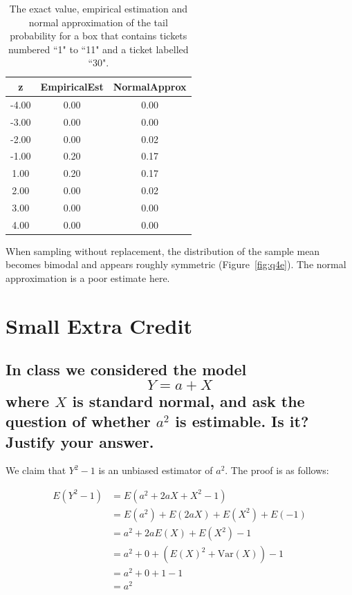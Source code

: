 \documentclass[11pt]{article}
\begin{document}
\begin{table}[H]
\centering
\begin{tabular}{|c|cc|}
  \hline
z & EmpiricalEst & NormalApprox \\ 
  \hline
-4.00 & 0.00 & 0.00 \\ 
  -3.00 & 0.00 & 0.00 \\ 
  -2.00 & 0.00 & 0.02 \\ 
  -1.00 & 0.20 & 0.17 \\ 
  1.00 & 0.20 & 0.17 \\ 
  2.00 & 0.00 & 0.02 \\ 
  3.00 & 0.00 & 0.00 \\ 
  4.00 & 0.00 & 0.00 \\ 
   \hline
\end{tabular}
\caption{The exact value, empirical estimation and normal approximation of the tail probability for a box that contains tickets numbered ``1" to ``11" and a ticket labelled ``30".} \label{tab:q4e}
\end{table}


\noindent When sampling without replacement, the distribution of the sample mean becomes bimodal and appears roughly symmetric (Figure~\ref{fig:q4e}).  The normal approximation is a poor estimate here.


\pagebreak

\section*{Small Extra Credit}
\subsection*{In class we considered the model
$$Y=a+X$$
where $X$ is standard normal, and ask the question of whether $a^2$ is estimable. Is it? Justify your answer.}

We claim that $Y^2 - 1$ is an unbiased estimator of $a^2$. The proof is as follows:

\begin{align*}
E(Y^2 - 1) &= E(a^2 + 2aX + X^2 - 1) \\
&= E(a^2) + E(2aX) + E(X^2) + E(-1) \\
&= a^2 + 2aE(X) + E(X^2) - 1 \\
&= a^2 + 0 + (E(X)^2 + \text{Var}(X)) - 1 \\
&= a^2 + 0 + 1 - 1\\
&= a^2
\end{align*}
\end{document}
